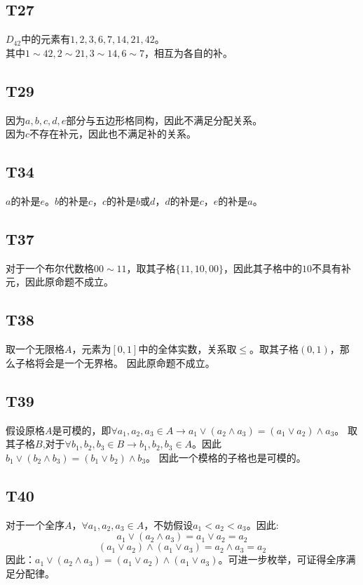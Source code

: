 \documentclass{article}
\begin{document}
\subsection{T27}
$D_{42}$中的元素有$1, 2, 3, 6, 7, 14, 21, 42$。\\
其中$1 \sim 42, 2 \sim 21, 3 \sim 14, 6 \sim 7$，相互为各自的补。
\subsection{T29}
因为$a, b, c, d, e$部分与五边形格同构，因此不满足分配关系。\\
因为$c$不存在补元，因此也不满足补的关系。
\subsection{T34}
$a$的补是$e$。$b$的补是$c$，$c$的补是$b$或$d$，$d$的补是$c$，$e$的补是$a$。
\subsection{T37}
对于一个布尔代数格$00 \sim 11$，取其子格$\{11, 10, 00\}$，因此其子格中的$10$不具有补元，因此原命题不成立。
\subsection{T38}
取一个无限格$A$，元素为$[0, 1]$中的全体实数，关系取$\leq$。取其子格$(0, 1)$，那么子格将会是一个无界格。
因此原命题不成立。
\subsection{T39}
假设原格$A$是可模的，即$\forall a_1, a_2, a_3 \in A \rightarrow a_1 \lor (a_2 \land a_3) = (a_1 \lor a_2) \land a_3$。
取其子格$B$,对于$\forall b_1, b_2, b_3 \in B \rightarrow b_1, b_2, b_3 \in A$。因此$b_1 \lor (b_2 \land b_3) = (b_1 \lor b_2) \land b_3$。
因此一个模格的子格也是可模的。
\subsection{T40}
对于一个全序$A$，$\forall a_1, a_2, a_3 \in A$，不妨假设$a_1 < a_2 < a_3$。因此:
$$
    a_1 \lor (a_2 \land a_3) = a_1 \lor a_2 = a_2
$$
$$
    (a_1 \lor a_2) \land (a_1 \lor a_3) = a_2 \land a_3 = a_2
$$
因此：$a_1 \lor (a_2 \land a_3) = (a_1 \lor a_2) \land (a_1 \lor a_3)$。可进一步枚举，可证得全序满足分配律。
\end{document}
